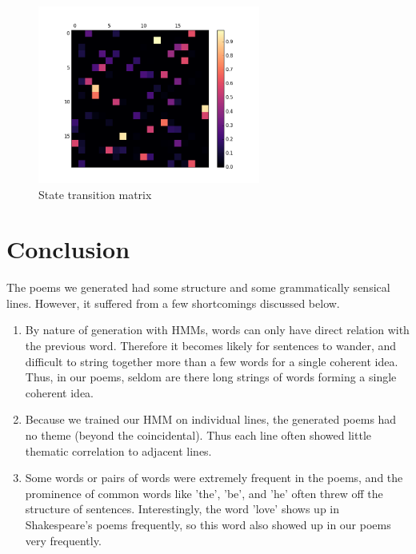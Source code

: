 \begin{figure}[h!]
	\centering
	\includegraphics[width=0.65\textwidth, clip=true, trim=1cm 1cm 1cm 1cm]{transition_matrix}
	\caption{State transition matrix}\label{fig:state-transition}
\end{figure}

\section{Conclusion}

The poems we generated had some structure and some grammatically sensical lines. However, it suffered from a few shortcomings discussed below.

\begin{enumerate}

\item By nature of generation with HMMs, words can only have direct relation with the previous word. Therefore it becomes likely for sentences to wander, and difficult to string together more than a few words for a single coherent idea. Thus, in our poems, seldom are there long strings of words forming a single coherent idea. 

\item Because we trained our HMM on individual lines, the generated poems had no theme (beyond the coincidental). Thus each line often showed little thematic correlation to adjacent lines.

\item Some words or pairs of words were extremely frequent in the poems, and the prominence of common words like 'the', 'be', and 'he' often threw off the structure of sentences. Interestingly, the word 'love' shows up in Shakespeare's poems frequently, so this word also showed up in our poems very frequently.

\end{enumerate}


